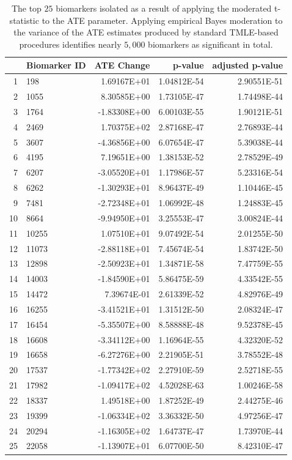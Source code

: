 \begin{table}[H]
\centering
\label{table:topresults}
\begin{tabular}{rlrrr}
  \hline
  & Biomarker ID & ATE Change & p-value & adjusted p-value \\
  \hline
  1 & 198 & 1.69167E+01 & 1.04812E-54 & 2.90551E-51 \\
  2 & 1055 & 8.30585E+00 & 1.73105E-47 & 1.74498E-44 \\
  3 & 1764 & -1.83308E+00 & 6.00103E-55 & 1.90121E-51 \\
  4 & 2469 & 1.70375E+02 & 2.87168E-47 & 2.76893E-44 \\
  5 & 3607 & -4.36856E+00 & 6.07654E-47 & 5.39038E-44 \\
  6 & 4195 & 7.19651E+00 & 1.38153E-52 & 2.78529E-49 \\
  7 & 6207 & -3.05520E+01 & 1.17986E-57 & 5.23316E-54 \\
  8 & 6262 & -1.30293E+01 & 8.96437E-49 & 1.10446E-45 \\
  9 & 7481 & -2.72348E+01 & 1.06992E-48 & 1.24883E-45 \\
  10 & 8664 & -9.94950E+01 & 3.25553E-47 & 3.00824E-44 \\
  11 & 10255 & 1.07510E+01 & 9.07492E-54 & 2.01255E-50 \\
  12 & 11073 & -2.88118E+01 & 7.45674E-54 & 1.83742E-50 \\
  13 & 12898 & -2.50923E+01 & 1.34871E-58 & 7.47759E-55 \\
  14 & 14003 & -1.84590E+01 & 5.86475E-59 & 4.33542E-55 \\
  15 & 14472 & 7.39674E-01 & 2.61339E-52 & 4.82976E-49 \\
  16 & 16255 & -3.41521E+01 & 1.31512E-50 & 2.08324E-47 \\
  17 & 16454 & -5.35507E+00 & 8.58888E-48 & 9.52378E-45 \\
  18 & 16608 & -3.34112E+00 & 1.16964E-55 & 4.32320E-52 \\
  19 & 16658 & -6.27276E+00 & 2.21905E-51 & 3.78552E-48 \\
  20 & 17537 & -1.77342E+02 & 2.27910E-59 & 2.52718E-55 \\
  21 & 17982 & -1.09417E+02 & 4.52028E-63 & 1.00246E-58 \\
  22 & 18337 & 1.49518E+00 & 1.87252E-49 & 2.44275E-46 \\
  23 & 19399 & -1.06334E+02 & 3.36332E-50 & 4.97256E-47 \\
  24 & 20294 & -1.16305E+02 & 1.64737E-47 & 1.73970E-44 \\
  25 & 22058 & -1.13907E+01 & 6.07700E-50 & 8.42310E-47 \\
  \hline
\end{tabular}
\caption{The top $25$ biomarkers isolated as a result of applying the moderated
  t-statistic to the ATE parameter. Applying empirical Bayes moderation to the
  variance of the ATE estimates produced by standard TMLE-based procedures
  identifies nearly $5,000$ biomarkers as significant in total.}
\end{table}

